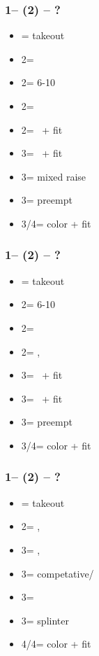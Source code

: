 \documentclass[12pt, a4paper]{report}
\begin{document}
\subsubsection*{1\hearts -- (2\clubs) -- ?}
\begin{itemize}
    \item \dbl = takeout
    \item 2\diams = \fonce
    \item 2\hearts = 6-10
    \item 2\spades = \fonce
    \item 2\nt = \gf\ + fit
    \item 3\clubs = \inv\ + fit
    \item 3\diams = mixed raise
    \item 3\hearts = preempt
    \item 3\spades/4\diams = color + fit
\end{itemize}

\subsubsection*{1\hearts -- (2\diams) -- ?}
\begin{itemize}
    \item \dbl = takeout
    \item 2\hearts = 6-10
    \item 2\spades = \fonce
    \item 2\nt = \clubs, \invp
    \item 3\clubs = \gf\ + fit
    \item 3\diams = \inv\ + fit
    \item 3\hearts = preempt
    \item 3\spades/4\clubs = color + fit
\end{itemize}

\subsubsection*{1\hearts -- (2\spades) -- ?}
\begin{itemize}
    \item \dbl = takeout
    \item 2\nt = \clubs, \invp
    \item 3\clubs = \diams, \invp
    \item 3\diams = \hearts competative/\gf
    \item 3\hearts = \hearts\ \inv
    \item 3\spades = splinter
    \item 4\clubs/4\diams = color + fit
\end{itemize}
\end{document}
